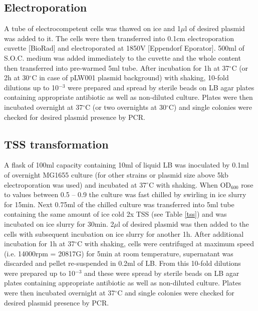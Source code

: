 \subsection{Electroporation}
A tube of electrocompetent cells was thawed on ice and 1$\mu$l of desired plasmid was added to it.
The cells were then transferred into 0.1cm electroporation cuvette [BioRad] and electroporated at 1850V [Eppendorf Eporator\textsuperscript{\textregistered}].
500ml of S.O.C. medium was added immediately to the cuvette and the whole content then transferred into pre-warmed 5ml tube.
After incubation for 1h at 37$^{\circ}$C (or 2h at 30$^{\circ}$C in case of pLW001 plasmid background) with shaking, 10-fold dilutions up to 10$^{-3}$ were prepared and spread by sterile beads on LB agar plates containing appropriate antibiotic as well as non-diluted culture.
Plates were then incubated overnight at 37$^{\circ}$C (or two overnights at 30$^{\circ}$C) and single colonies were checked for desired plasmid presence by PCR.

\subsection{TSS transformation}
A flask of 100ml capacity containing 10ml of liquid LB was inoculated by 0.1ml of overnight MG1655 culture (for other strains or plasmid size above 5kb electroporation was used) and incubated at 37$^{\circ}$C with shaking.
When OD$_{600}$ rose to values between 0.5 -- 0.9 the culture was fast chilled by swirling in ice slurry for 15min.
Next 0.75ml of the chilled culture was transferred into 5ml tube containing the same amount of ice cold 2x TSS (see Table \ref{tss}) and was incubated on ice slurry for 30min.
2$\mu$l of desired plasmid was then added to the cells with subsequent incubation on ice slurry for another 1h.
After additional incubation for 1h at 37$^{\circ}$C with shaking, cells were centrifuged at maximum speed (i.e. 14000rpm = 20817G) for 5min at room temperature, supernatant was discarded and pellet re-suspended in 0.2ml of LB.
From this 10-fold dilutions were prepared up to 10$^{-3}$ and these were spread by sterile beads on LB agar plates containing appropriate antibiotic as well as non-diluted culture.
Plates were then incubated overnight at 37$^{\circ}$C and single colonies were checked for desired plasmid presence by PCR.

